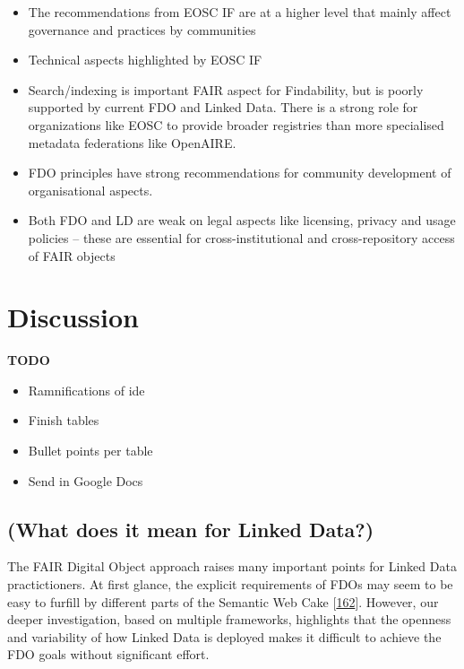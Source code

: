 \begin{itemize}
\tightlist
\item
  The recommendations from EOSC IF are at a higher level that mainly affect governance and practices by communities
\item
  Technical aspects highlighted by EOSC IF
\item
  Search/indexing is important FAIR aspect for Findability, but is poorly supported by current FDO and Linked Data. There is a strong role for organizations like EOSC to provide broader registries than more specialised metadata federations like OpenAIRE.
\item
  FDO principles have strong recommendations for community development of organisational aspects.
\item
  Both FDO and LD are weak on legal aspects like licensing, privacy and usage policies -- these are essential for cross-institutional and cross-repository access of FAIR objects
\end{itemize}

\hypertarget{sec:discussion}{%
\section{Discussion}\label{sec:discussion}}

\textbf{TODO}

\begin{itemize}
\tightlist
\item
  Ramnifications of ide
\item
  Finish tables
\item
  Bullet points per table
\item
  Send in Google Docs
\end{itemize}

\hypertarget{what-does-it-mean-for-linked-data}{%
\subsection{(What does it mean for Linked Data?)}\label{what-does-it-mean-for-linked-data}}

The FAIR Digital Object approach raises many important points for Linked Data practictioners.
At first glance, the explicit requirements of FDOs may seem to be easy to furfill by different parts of the Semantic Web Cake {[}\protect\hyperlink{ref-kYjzRJ0H}{162}{]}.
However, our deeper investigation, based on multiple frameworks, highlights that the openness and variability of how Linked Data is deployed makes it difficult to achieve the FDO goals without significant effort.

